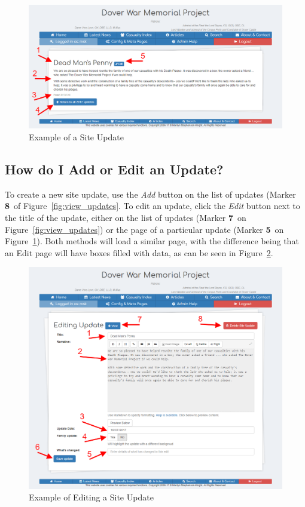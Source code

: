 \documentclass[12pt]{article}
\newcommand{\marker}[1]{Marker \color{red}\textbf{#1}\color{black}}
\begin{document}
\begin{figure}[h]
  \centering
 \includegraphics[width=.9\textwidth]{pics/view_update.png}
	\caption{Example of a Site Update}\label{fig:view_update}
\end{figure}

\newpage
\FloatBarrier
\subsection{How do I Add or Edit an Update?}\label{ssec:edit_update}
To create a new site update, use the \textit{Add} button on the list of updates (\marker{8}\ of Figure~\ref{fig:view_updates}. To edit an update, click the \textit{Edit} button next to the title of the update, either on the list of updates (\marker{7}\ on Figure~\ref{fig:view_updates}) or the page of a particular update (\marker{5}\ on Figure~\ref{fig:view_update}). Both methods will load a similar page, with the difference being that an Edit page will have boxes filled with data, as can be seen in Figure~\ref{fig:edit_update}.

\begin{figure}[h]
  \centering
 \includegraphics[width=.9\textwidth]{pics/edit_update.png}
	\caption{Example of Editing a Site Update}\label{fig:edit_update}
\end{figure}
\end{document}
